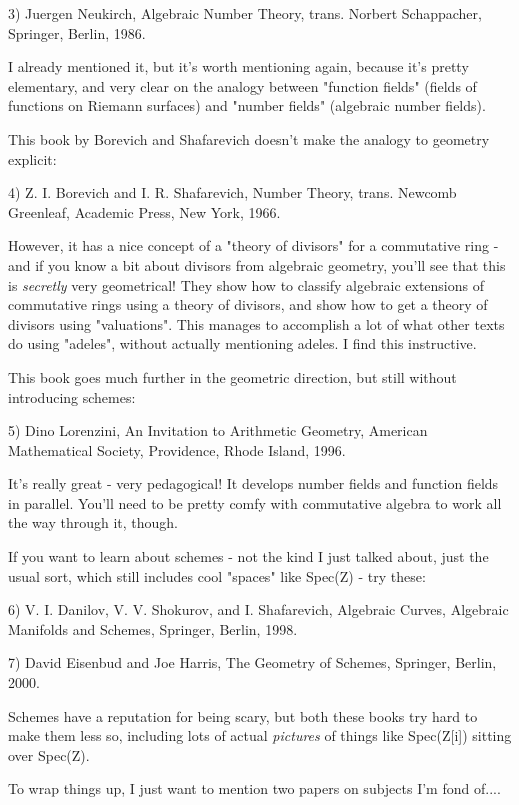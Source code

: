 3) Juergen Neukirch, Algebraic Number Theory, trans. Norbert 
Schappacher, Springer, Berlin, 1986. 

I already mentioned it, but it's worth mentioning again, because it's 
pretty elementary, and very clear on the analogy between "function 
fields" (fields of functions on Riemann surfaces) and "number 
fields" (algebraic number fields).  

This book by Borevich and Shafarevich doesn't make the analogy to 
geometry explicit:

4) Z. I. Borevich and I. R. Shafarevich, Number Theory, trans.
Newcomb Greenleaf, Academic Press, New York, 1966.

However, it has a nice concept of a "theory of divisors" for a 
commutative ring - and if you know a bit about divisors from algebraic 
geometry, you'll see that this is \emph{secretly} very geometrical!  They
show how to classify algebraic extensions of commutative rings using 
a theory of divisors, and show how to get a theory of divisors using 
"valuations".  This manages to accomplish a lot of what other 
texts do 
using "adeles", without actually mentioning adeles.  I find this 
instructive. 

This book goes much further in the geometric direction, but still
without introducing schemes:

5) Dino Lorenzini, An Invitation to Arithmetic Geometry, 
American Mathematical Society, Providence, Rhode Island, 1996.

It's really great - very pedagogical!  It develops number fields and
function fields in parallel.  You'll need to be pretty comfy with 
commutative algebra to work all the way through it, though.

If you want to learn about schemes - not the kind I just talked about,
just the usual sort, which still includes cool "spaces" like 
Spec(Z) - 
try these:

6) V. I. Danilov, V. V. Shokurov, and I. Shafarevich, Algebraic Curves, 
Algebraic Manifolds and Schemes, Springer, Berlin, 1998.  

7) David Eisenbud and Joe Harris, The Geometry of Schemes, Springer,
Berlin, 2000.

Schemes have a reputation for being scary, but both these books try hard
to make them less so, including lots of actual \emph{pictures} of things like
Spec(Z[i]) sitting over Spec(Z).

To wrap things up, I just want to mention two papers on subjects I'm 
fond of....

